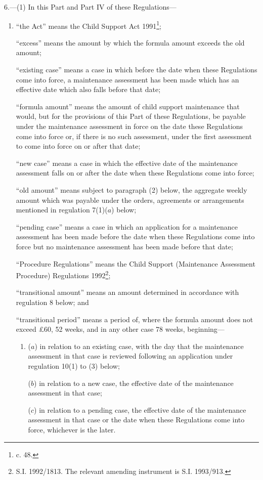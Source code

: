 \documentclass[a4paper]{article}
\begin{document}
6.—(1) In this Part and Part IV of these Regulations—
\begin{enumerate}\item[]
“the Act” means the Child Support Act 1991\footnote{ c. 48.};

“excess” means the amount by which the formula amount exceeds the old amount;

“existing case” means a case in which before the date when these Regulations come into force, a maintenance assessment has been made which has an effective date which also falls before that date;

“formula amount” means the amount of child support maintenance that would, but for the provisions of this Part of these Regulations, be payable under the maintenance assessment in force on the date these Regulations come into force or, if there is no such assessment, under the first assessment to come into force on or after that date;

“new case” means a case in which the effective date of the maintenance assessment falls on or after the date when these Regulations come into force;

“old amount” means subject to paragraph (2) below, the aggregate weekly amount which was payable under the orders, agreements or arrangements mentioned in regulation 7(1)($a$) below;

“pending case” means a case in which an application for a maintenance assessment has been made before the date when these Regulations come into force but no maintenance assessment has been made before that date;

“Procedure Regulations” means the Child Support (Maintenance Assessment Procedure) Regulations 1992\footnote{\frenchspacing S.I. 1992/1813. The relevant amending instrument is S.I. 1993/913.};

“transitional amount” means an amount determined in accordance with regulation 8 below; and

“transitional period” means a period of, where the formula amount does not exceed £60, 52 weeks, and in any other case 78 weeks, beginning—
\begin{enumerate}\item[]
($a$) in relation to an existing case, with the day that the maintenance assessment in that case is reviewed following an application under regulation 10(1) to (3) below;

($b$) in relation to a new case, the effective date of the maintenance assessment in that case;

($c$) in relation to a pending case, the effective date of the maintenance assessment in that case or the date when these Regulations come into force, whichever is the later.
\end{enumerate}
\end{enumerate}
\end{document}
